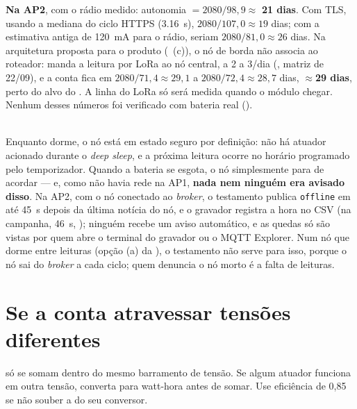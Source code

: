 \begin{description}[style=unboxed, leftmargin=0pt, font=\normalfont\bfseries]
    \textbf{Na AP2}, com o rádio medido: autonomia $= 2080 / 98{,}9
    \approx$ \textbf{21 dias}. Com TLS, usando a mediana do ciclo HTTPS
    (\SI{3,16}{\second}), $2080 / 107{,}0 \approx 19$ dias; com a
    estimativa antiga de \SI{120}{\milli\ampere} para o rádio, seriam
    $2080 / 81{,}0 \approx 26$ dias. Na arquitetura proposta para o
    produto (~(c)), o nó de borda não associa ao roteador: manda
    a leitura por LoRa ao nó central, a 2 a \SI{3}{\mAh}/dia
    (\folhadedados, matriz de 22/09), e a conta fica em
    $2080 / 71{,}4 \approx 29{,}1$ a $2080 / 72{,}4 \approx 28{,}7$
    dias, \textbf{$\approx$29 dias}, perto do alvo do . A linha
    do LoRa só será medida quando o módulo chegar.
    Nenhum desses números foi verificado com bateria real ().
  \item[4. O que acontece quando a energia acaba --- ou enquanto o nó dorme.]\hfill\\
    Enquanto dorme, o nó está em estado seguro por definição: não há
    atuador acionado durante o \emph{deep sleep}, e a próxima leitura
    ocorre no horário programado pelo temporizador. Quando a bateria se
    esgota, o nó simplesmente para de acordar --- e, como não havia rede
    na AP1, \textbf{nada nem ninguém era avisado disso}. Na AP2, com o
    nó conectado ao \emph{broker}, o testamento publica \texttt{offline}
    em até \SI{45}{\second} depois da última notícia do nó, e o gravador
    registra a hora no CSV (na campanha, \SI{46}{\second}, );
    ninguém recebe um aviso automático, e as quedas só são vistas por
    quem abre o terminal do gravador ou o MQTT Explorer. Num nó que dorme entre leituras (opção (a) da
    ), o testamento não serve para isso, porque o nó sai do
    \emph{broker} a cada ciclo; quem denuncia o nó morto é a falta de
    leituras.
\end{description}

\section*{Se a conta atravessar tensões diferentes}
{}

\begin{orientacao}
\SI{}{\mAh} só se somam dentro do mesmo barramento de tensão. Se algum
atuador funciona em outra tensão, converta para watt-hora antes de somar.
Use eficiência de 0,85 se não souber a do seu conversor.
\end{orientacao}

